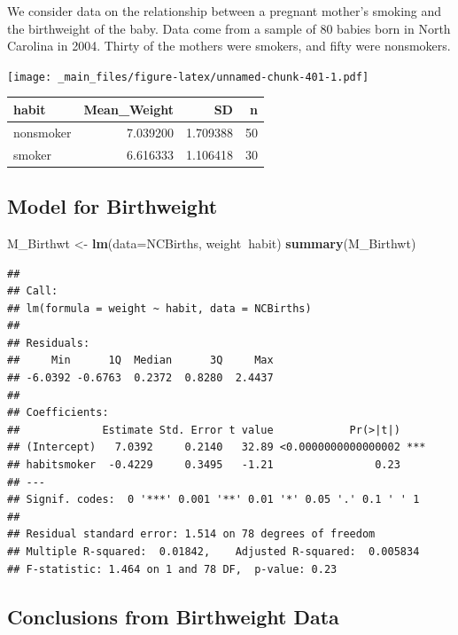 \documentclass[]{book}
\newenvironment{Shaded}{\begin{snugshade}}{\end{snugshade}}
\newcommand{\KeywordTok}[1]{\textcolor[rgb]{0.13,0.29,0.53}{\textbf{#1}}}
\newcommand{\DataTypeTok}[1]{\textcolor[rgb]{0.13,0.29,0.53}{#1}}
\newcommand{\StringTok}[1]{\textcolor[rgb]{0.31,0.60,0.02}{#1}}
\newcommand{\OperatorTok}[1]{\textcolor[rgb]{0.81,0.36,0.00}{\textbf{#1}}}
\newcommand{\NormalTok}[1]{#1}
\begin{document}
We consider data on the relationship between a pregnant mother's smoking
and the birthweight of the baby. Data come from a sample of 80 babies
born in North Carolina in 2004. Thirty of the mothers were smokers, and
fifty were nonsmokers.

\texttt{[image: \_main\_files/figure-latex/unnamed-chunk-401-1.pdf]}

\begin{tabular}{l|r|r|r}
\hline
habit & Mean\_Weight & SD & n\\
\hline
nonsmoker & 7.039200 & 1.709388 & 50\\
\hline
smoker & 6.616333 & 1.106418 & 30\\
\hline
\end{tabular}

\subsection{Model for Birthweight}\label{model-for-birthweight}

\begin{Shaded}
\begin{Highlighting}[]
\NormalTok{M_Birthwt <-}\StringTok{ }\KeywordTok{lm}\NormalTok{(}\DataTypeTok{data=}\NormalTok{NCBirths, weight}\OperatorTok{~}\NormalTok{habit)}
\KeywordTok{summary}\NormalTok{(M_Birthwt)}
\end{Highlighting}
\end{Shaded}

\begin{verbatim}
## 
## Call:
## lm(formula = weight ~ habit, data = NCBirths)
## 
## Residuals:
##     Min      1Q  Median      3Q     Max 
## -6.0392 -0.6763  0.2372  0.8280  2.4437 
## 
## Coefficients:
##             Estimate Std. Error t value            Pr(>|t|)    
## (Intercept)   7.0392     0.2140   32.89 <0.0000000000000002 ***
## habitsmoker  -0.4229     0.3495   -1.21                0.23    
## ---
## Signif. codes:  0 '***' 0.001 '**' 0.01 '*' 0.05 '.' 0.1 ' ' 1
## 
## Residual standard error: 1.514 on 78 degrees of freedom
## Multiple R-squared:  0.01842,    Adjusted R-squared:  0.005834 
## F-statistic: 1.464 on 1 and 78 DF,  p-value: 0.23
\end{verbatim}

\subsection{Conclusions from Birthweight
Data}\label{conclusions-from-birthweight-data}
\end{document}
